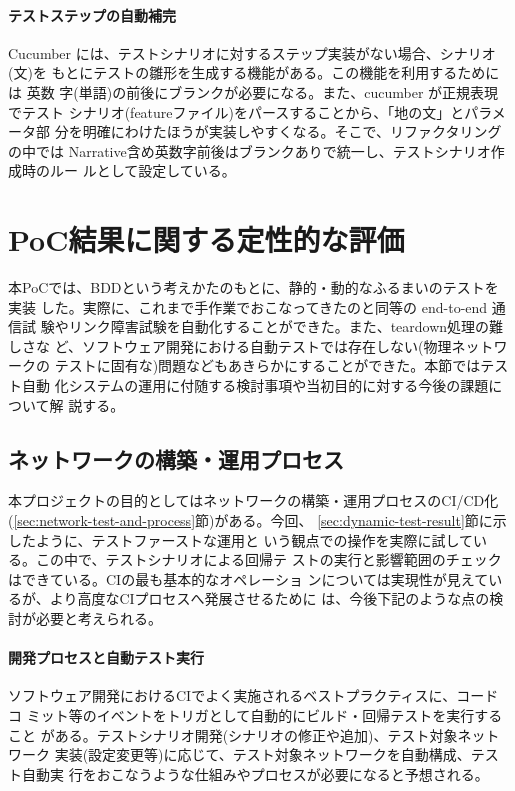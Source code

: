 \paragraph{テストステップの自動補完}

Cucumber には、テストシナリオに対するステップ実装がない場合、シナリオ(文)を
もとにテストの雛形を生成する機能がある。この機能を利用するためには 英数
字(単語)の前後にブランクが必要になる。また、cucumber が正規表現でテスト
シナリオ(featureファイル)をパースすることから、「地の文」とパラメータ部
分を明確にわけたほうが実装しやすくなる。そこで、リファクタリングの中では
Narrative含め英数字前後はブランクありで統一し、テストシナリオ作成時のルー
ルとして設定している。

\section{PoC結果に関する定性的な評価}

本PoCでは、BDDという考えかたのもとに、静的・動的なふるまいのテストを実装
した。実際に、これまで手作業でおこなってきたのと同等の end-to-end 通信試
験やリンク障害試験を自動化することができた。また、teardown処理の難しさな
ど、ソフトウェア開発における自動テストでは存在しない(物理ネットワークの
テストに固有な)問題などもあきらかにすることができた。本節ではテスト自動
化システムの運用に付随する検討事項や当初目的に対する今後の課題について解
説する。

  \subsection{ネットワークの構築・運用プロセス}

本プロジェクトの目的としてはネットワークの構築・運用プロセスのCI/CD化
(\ref{sec:network-test-and-process}節)がある。今回、
\ref{sec:dynamic-test-result}節に示したように、テストファーストな運用と
いう観点での操作を実際に試している。この中で、テストシナリオによる回帰テ
ストの実行と影響範囲のチェックはできている。CIの最も基本的なオペレーショ
ンについては実現性が見えているが、より高度なCIプロセスへ発展させるために
は、今後下記のような点の検討が必要と考えられる。

    \paragraph{開発プロセスと自動テスト実行}
ソフトウェア開発におけるCIでよく実施されるベストプラクティスに、コードコ
ミット等のイベントをトリガとして自動的にビルド・回帰テストを実行すること
がある。テストシナリオ開発(シナリオの修正や追加)、テスト対象ネットワーク
実装(設定変更等)に応じて、テスト対象ネットワークを自動構成、テスト自動実
行をおこなうような仕組みやプロセスが必要になると予想される。


